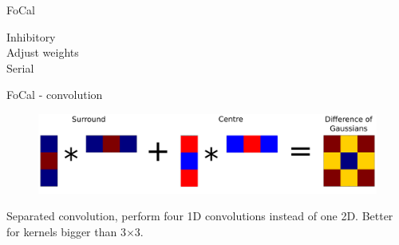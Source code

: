 \documentclass[17pt,mathserif]{beamer}
\begin{document}
\begin{frame}{FoCal}
\begin{minipage}{0.48\textwidth}
\begin{figure}
        \end{figure}
        \vspace*{-1em}
        Inhibitory\\
        Adjust weights\\
        Serial
      \end{minipage}
    \end{frame}

    \begin{frame}{FoCal - convolution}
      \vspace*{-3em}
      \centering
        \begin{figure}
          \includegraphics[width=\textwidth]{./separated}
        \end{figure}
        \vspace*{-1em}
        Separated convolution, perform four 1D convolutions instead of one 2D. 
        Better for kernels bigger than 3$\times$3.
    \end{frame}
    
\end{document}
